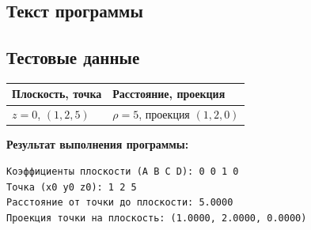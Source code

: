 \subsection{Текст программы}



\subsection{Тестовые данные}

\begin{center}
\begin{tabular}{l|l}
\toprule
Плоскость, точка & Расстояние, проекция \\
\midrule
$z=0$, $(1,2,5)$ & $\rho=5$, проекция $(1,2,0)$ \\
\bottomrule
\end{tabular}
\end{center}

\textbf{Результат выполнения программы:}
\begin{lstlisting}[language={},basicstyle=\ttfamily\small,frame=single]
Коэффициенты плоскости (A B C D): 0 0 1 0
Точка (x0 y0 z0): 1 2 5
Расстояние от точки до плоскости: 5.0000
Проекция точки на плоскость: (1.0000, 2.0000, 0.0000)
\end{lstlisting}

